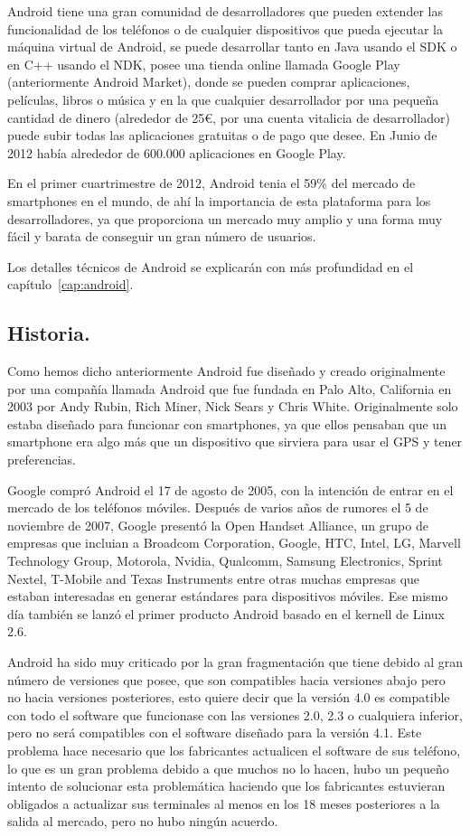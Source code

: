 Android tiene una gran comunidad de desarrolladores que pueden extender las funcionalidad de los teléfonos o de cualquier dispositivos que pueda ejecutar la máquina virtual de Android, se puede desarrollar tanto en Java usando el SDK o en C++ usando el NDK, posee una tienda online llamada Google Play (anteriormente Android Market), donde se pueden comprar aplicaciones, películas, libros o música y en la que cualquier desarrollador por una pequeña cantidad de dinero (alrededor de 25\euro, por una cuenta vitalicia de desarrollador) puede subir todas las aplicaciones gratuitas o de pago que desee. En Junio de 2012 había alrededor de 600.000 aplicaciones en Google Play.

En el primer cuartrimestre de 2012, Android tenia el 59\% del mercado de smartphones en el mundo, de ahí la importancia de esta plataforma para los desarrolladores, ya que proporciona un mercado muy amplio y una forma muy fácil y barata de conseguir un gran número de usuarios.

Los detalles técnicos de Android se explicarán con más profundidad en el capítulo~\ref{cap:android}.

\subsection{Historia.}

Como hemos dicho anteriormente Android fue diseñado y creado originalmente por una compañía llamada Android que fue fundada en Palo Alto, California en 2003 por Andy Rubin, Rich Miner, Nick Sears y Chris White. Originalmente solo estaba diseñado para funcionar con smartphones, ya que ellos pensaban que un smartphone era algo más que un dispositivo que sirviera para usar el GPS y tener preferencias. 

Google compró Android el 17 de agosto de 2005, con la intención de entrar en el mercado de los teléfonos móviles. Después de varios años de rumores el 5 de noviembre de 2007, Google presentó la Open Handset Alliance, un grupo de empresas que incluian a Broadcom Corporation, Google, HTC, Intel, LG, Marvell Technology Group, Motorola, Nvidia, Qualcomm, Samsung Electronics, Sprint Nextel, T-Mobile and Texas Instruments entre otras muchas empresas que estaban interesadas en generar estándares para dispositivos móviles. Ese mismo día también se lanzó el primer producto Android basado en el kernell de Linux 2.6.

Android ha sido muy criticado por la gran fragmentación que tiene debido al gran número de versiones que posee, que son compatibles hacia versiones abajo pero no hacia versiones posteriores, esto quiere decir que la versión 4.0 es compatible con todo el software que funcionase con las versiones 2.0, 2.3 o cualquiera inferior, pero no será compatibles con el software diseñado para la versión 4.1. Este problema hace necesario que los fabricantes actualicen el software de sus teléfono, lo que es un gran problema debido a que muchos no lo hacen, hubo un pequeño intento de solucionar esta problemática haciendo que los fabricantes estuvieran obligados a actualizar sus terminales al menos en los 18 meses posteriores a la salida al mercado, pero no hubo ningún acuerdo.   

